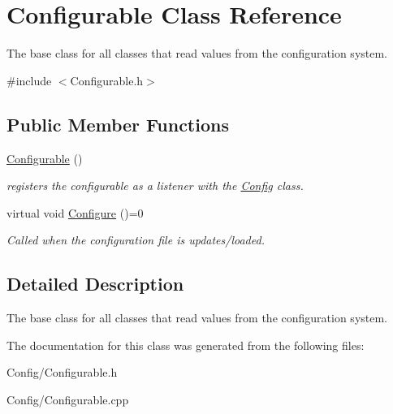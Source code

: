 \hypertarget{class_configurable}{\section{\-Configurable \-Class \-Reference}
\label{class_configurable}
}


\-The base class for all classes that read values from the configuration system.  




{\ttfamily \#include $<$\-Configurable.\-h$>$}

\subsection*{\-Public \-Member \-Functions}
\begin{DoxyCompactItemize}
\item 
\hypertarget{class_configurable_a058f698c44e2c2fb6d4366a0fbe624f2}{\hyperlink{class_configurable_a058f698c44e2c2fb6d4366a0fbe624f2}{\-Configurable} ()}\label{class_configurable_a058f698c44e2c2fb6d4366a0fbe624f2}

\begin{DoxyCompactList}\small\item\em registers the configurable as a listener with the \hyperlink{class_config}{\-Config} class. \end{DoxyCompactList}\item 
\hypertarget{class_configurable_a951fdca310cfb5e2090ca10734a181e1}{virtual void \hyperlink{class_configurable_a951fdca310cfb5e2090ca10734a181e1}{\-Configure} ()=0}\label{class_configurable_a951fdca310cfb5e2090ca10734a181e1}

\begin{DoxyCompactList}\small\item\em \-Called when the configuration file is updates/loaded. \end{DoxyCompactList}\end{DoxyCompactItemize}


\subsection{\-Detailed \-Description}
\-The base class for all classes that read values from the configuration system. 

\-The documentation for this class was generated from the following files\-:\begin{DoxyCompactItemize}
\item 
\-Config/\-Configurable.\-h\item 
\-Config/\-Configurable.\-cpp\end{DoxyCompactItemize}
